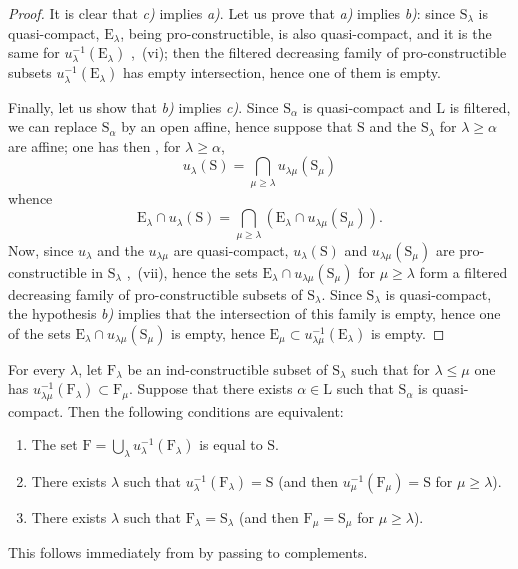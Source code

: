\begin{proof}
It is clear that \emph{c)} implies \emph{a)}.
Let us prove that \emph{a)} implies \emph{b)}: since $\mathrm{S}_\lambda$ is quasi-compact, $\mathrm{E}_\lambda$, being pro-constructible, is also quasi-compact, and it is the same for $u_\lambda^{-1}(\mathrm{E}_\lambda)$ ,~(vi); then the filtered decreasing family of pro-constructible subsets $u_\lambda^{-1}(\mathrm{E}_\lambda)$ has empty intersection, hence  one of them is empty.

Finally, let us show that \emph{b)} implies \emph{c)}.
Since $\mathrm{S}_\alpha$ is quasi-compact and $\mathrm{L}$ is filtered, we can replace $\mathrm{S}_\alpha$ by an open affine, hence suppose  that $\mathrm{S}$ and the $\mathrm{S}_\lambda$ for $\lambda\geqslant\alpha$ are affine; one has then , for $\lambda\geqslant\alpha$,
\[
  u_\lambda(\mathrm{S})=\bigcap_{\mu\geqslant\lambda}u_{\lambda\mu}(\mathrm{S}_\mu)
\]
whence
\[
  \mathrm{E}_\lambda\cap u_\lambda(\mathrm{S})=\bigcap_{\mu\geqslant\lambda}(\mathrm{E}_\lambda\cap u_{\lambda\mu}(\mathrm{S}_\mu)).
\]
Now, since $u_\lambda$ and the $u_{\lambda\mu}$ are quasi-compact, $u_\lambda(\mathrm{S})$ and $u_{\lambda\mu}(\mathrm{S}_\mu)$ are pro-constructible in $\mathrm{S}_\lambda$ ,~(vii), hence the sets $\mathrm{E}_\lambda\cap u_{\lambda\mu}(\mathrm{S}_\mu)$ for $\mu\geqslant\lambda$ form a filtered decreasing family of pro-constructible subsets of $\mathrm{S}_\lambda$.
Since $\mathrm{S}_\lambda$ is quasi-compact, the hypothesis \emph{b)} implies that the intersection of this family is empty, hence  one of the sets $\mathrm{E}_\lambda\cap u_{\lambda\mu}(\mathrm{S}_\mu)$ is empty, hence $\mathrm{E}_\mu\subset u_{\lambda\mu}^{-1}(\mathrm{E}_\lambda)$ is empty.
\end{proof}

\begin{corollary}[8.3.4]
\label{IV.8.3.4}
For every $\lambda$, let $\mathrm{F}_\lambda$ be an ind-constructible subset of $\mathrm{S}_\lambda$ such that for $\lambda\leqslant\mu$ one has $u_{\lambda\mu}^{-1}(\mathrm{F}_\lambda)\subset\mathrm{F}_\mu$.
Suppose that there exists $\alpha\in\mathrm{L}$ such that $\mathrm{S}_\alpha$ is quasi-compact.
Then the following conditions are equivalent:
\begin{enumerate}[label=\emph{\alph*)}]
  \item The set $\mathrm{F}=\bigcup_\lambda u_\lambda^{-1}(\mathrm{F}_\lambda)$ is equal to $\mathrm{S}$.
  \item There exists $\lambda$ such that $u_\lambda^{-1}(\mathrm{F}_\lambda)=\mathrm{S}$ (and then $u_\mu^{-1}(\mathrm{F}_\mu)=\mathrm{S}$ for $\mu\geqslant\lambda$).
  \item There exists $\lambda$ such that $\mathrm{F}_\lambda=\mathrm{S}_\lambda$ (and then $\mathrm{F}_\mu=\mathrm{S}_\mu$ for $\mu\geqslant\lambda$).
\end{enumerate}
This follows immediately from  by passing to complements.
\end{corollary}

